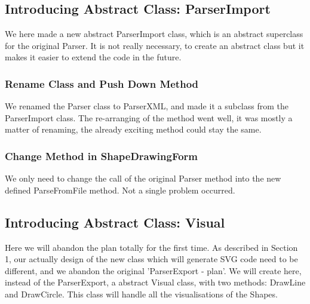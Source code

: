 \documentclass[a4paper,12pt]{article}
\begin{document}
\subsection{Introducing Abstract Class: ParserImport}
We here made a new abstract ParserImport class, which is an abstract superclass for the original Parser.  It is not really necessary, to create an abstract class but it makes it easier to extend the code in the future.

\subsubsection{Rename Class and Push Down Method}
We renamed the Parser class to ParserXML, and made it a subclass from the ParserImport class. The re-arranging of the method went well, it was mostly a matter of renaming, the already exciting method could stay the same.


\subsubsection{Change Method in ShapeDrawingForm}
We only need to change the call of the original Parser method into the new defined ParseFromFile method. Not a single problem occurred.


\subsection{Introducing Abstract Class: Visual}
Here we will abandon the plan totally for the first time. As described in Section 1, our actually design of the new class which will generate SVG code need to be different, and we abandon the original 'ParserExport - plan'. We will create here, instead of the ParserExport, a abstract Visual class, with two methods: DrawLine and DrawCircle. This class will handle all the visualisations of the Shapes.
\end{document}
